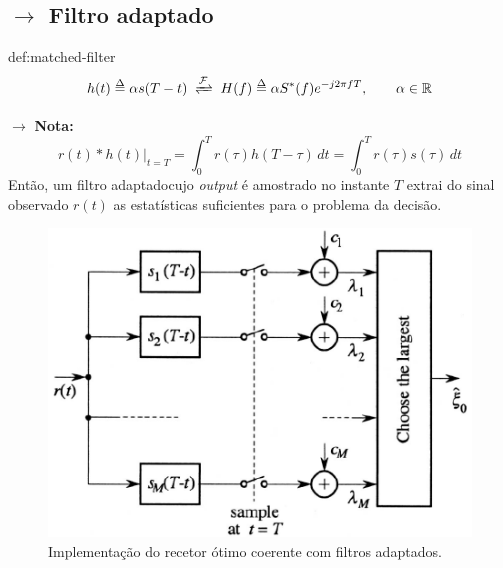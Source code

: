 \clearpage
\subsection[4.3 Filtro adaptado]{$\rightarrow$ Filtro adaptado}
\label{subsec:matched-filter}

\begin{theo}{def:matched-filter}\label{def:matched-filter}
    $$
        h(t) \delequal \alpha s(T-t)\; \xrightleftharpoons[]{\mathcal{F}}\; H(f) \delequal \alpha S^*(f)e^{-j2\pi f T},\qquad \alpha \in \mathbb{R}
    $$

    \noindent $\pmb{\rightarrow}$ \textbf{Nota:} 
    $$
        r(t) \ast h(t)\biggr|_{t=T} = \int_{0}^{T} r(\tau)h(T-\tau) \,dt =  \int_{0}^{T} r(\tau)s(\tau) \,dt
    $$
    Então, um filtro adaptado\footnotemark[3] cujo \textit{output} é amostrado no instante $T$ extrai do sinal observado $r(t)$ as estatísticas suficientes para o problema da decisão.

    \vspace{-1em}
    \begin{figure}[H]
        \centering
        \includegraphics[width=0.5\linewidth]{img/digital/AWGN-transmission/detection-matched-filter.png} 
        \caption{Implementação do recetor ótimo coerente com filtros adaptados.\cite{Benedetto1999}} 
        \label{fig:detection-matched-filter} 
    \end{figure}
\end{theo}


